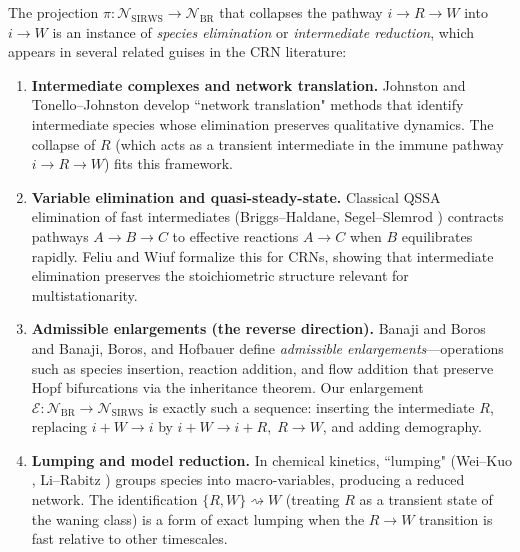 
\begin{remark}\label{rem:contraction}
The projection $\pi\colon \mathcal{N}_{\mathrm{SIRWS}} \to \mathcal{N}_{\mathrm{BR}}$
that collapses the pathway $i\to R\to W$ into $i\to W$ is an instance of
\emph{species elimination} or \emph{intermediate reduction}, which appears
in several related guises in the CRN literature:

\begin{enumerate}[nosep]
\item \textbf{Intermediate complexes and network translation.}
  Johnston \cite{Johnston14} and Tonello--Johnston \cite{TJ18} develop
  ``network translation" methods that identify intermediate species whose
  elimination preserves qualitative dynamics.
  The collapse of $R$ (which acts as a transient intermediate in the
  immune pathway $i\to R\to W$) fits this framework.

\item \textbf{Variable elimination and quasi-steady-state.}
  Classical QSSA elimination of fast intermediates
  (Briggs--Haldane, Segel--Slemrod \cite{SS89}) contracts pathways
  $A\to B\to C$ to effective reactions $A\to C$ when $B$ equilibrates rapidly.
  Feliu and Wiuf \cite{FW13} formalize this for CRNs, showing that
  intermediate elimination preserves the stoichiometric structure
  relevant for multistationarity.

\item \textbf{Admissible enlargements (the reverse direction).}
  Banaji and Boros \cite{BB22} and Banaji, Boros, and Hofbauer \cite{BBH25}
  define \emph{admissible enlargements}---operations such as species insertion,
  reaction addition, and flow addition that preserve Hopf
  bifurcations via the inheritance theorem.
  Our enlargement $\mathcal{E}\colon \mathcal{N}_{\mathrm{BR}} \to
  \mathcal{N}_{\mathrm{SIRWS}}$ is exactly such a sequence: inserting
  the intermediate $R$, replacing $i+W\to i$ by
  $i+W\to i+R,\; R\to W$, and adding demography.

\item \textbf{Lumping and model reduction.}
  In chemical kinetics, ``lumping" (Wei--Kuo \cite{WK69},
  Li--Rabitz \cite{LR89}) groups species into macro-variables,
  producing a reduced network.
  The identification $\{R,W\}\rightsquigarrow W$ (treating $R$ as a
  transient state of the waning class) is a form of exact lumping
  when the $R\to W$ transition is fast relative to other timescales.
\end{enumerate}


\end{remark}
